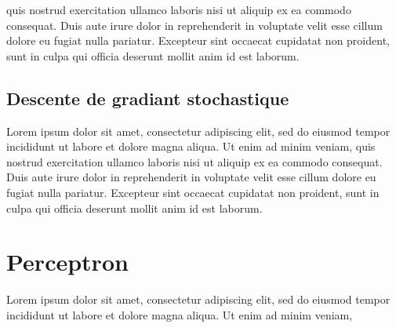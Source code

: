 		
		quis nostrud exercitation ullamco laboris nisi ut aliquip ex ea commodo consequat. Duis aute irure dolor in reprehenderit in voluptate velit esse cillum dolore eu fugiat nulla pariatur. Excepteur sint occaecat cupidatat non proident, sunt in culpa qui officia deserunt mollit anim id est laborum.
		
	\subsection{Descente de gradiant stochastique}
		Lorem ipsum dolor sit amet, consectetur adipiscing elit, sed do eiusmod tempor incididunt ut labore et dolore magna aliqua. Ut enim ad minim veniam, quis nostrud exercitation ullamco laboris nisi ut aliquip ex ea commodo consequat. Duis aute irure dolor in reprehenderit in voluptate velit esse cillum dolore eu fugiat nulla pariatur. Excepteur sint occaecat cupidatat non proident, sunt in culpa qui officia deserunt mollit anim id est laborum.
	\section{Perceptron}
		Lorem ipsum dolor sit amet, consectetur adipiscing elit, sed do eiusmod tempor incididunt ut labore et dolore magna aliqua. Ut enim ad minim veniam,
		